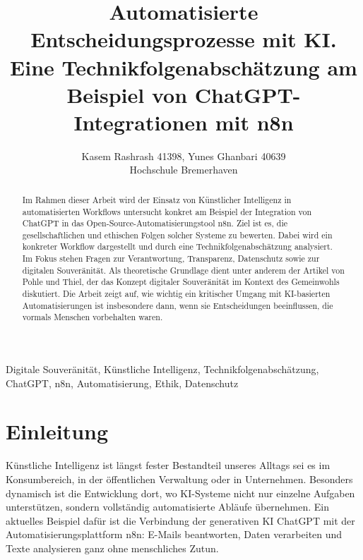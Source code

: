 \documentclass[utf8,biblatex]{bremerhaven_lni}
\begin{document}
\title[Ein Kurztitel]{Automatisierte Entscheidungsprozesse mit KI. Eine Technikfolgenabschätzung am Beispiel von ChatGPT-Integrationen mit n8n}


\author[Kasem Rashrash 41398, Yunes Ghanbari 40639]
{Kasem Rashrash 41398, Yunes Ghanbari 40639\\ 
Hochschule Bremerhaven}
\maketitle

\begin{abstract}
Im Rahmen dieser Arbeit wird der Einsatz von Künstlicher Intelligenz in automatisierten Workflows untersucht
konkret am Beispiel der Integration von ChatGPT in das Open-Source-Automatisierungstool n8n. 
Ziel ist es, die gesellschaftlichen und ethischen Folgen solcher Systeme zu bewerten. 
Dabei wird ein konkreter Workflow dargestellt und durch eine Technikfolgenabschätzung analysiert. 
Im Fokus stehen Fragen zur Verantwortung, Transparenz, Datenschutz sowie zur digitalen Souveränität. 
Als theoretische Grundlage dient unter anderem der Artikel von Pohle und Thiel, der das Konzept digitaler Souveränität 
im Kontext des Gemeinwohls diskutiert. Die Arbeit zeigt auf, wie wichtig ein kritischer Umgang 
mit KI-basierten Automatisierungen ist insbesondere dann, wenn sie Entscheidungen beeinflussen, die vormals Menschen vorbehalten waren.
\end{abstract}

\begin{keywords}
Digitale Souveränität, Künstliche Intelligenz, Technikfolgenabschätzung, ChatGPT, n8n, Automatisierung, Ethik, Datenschutz
\end{keywords}

\section{Einleitung}
Künstliche Intelligenz ist längst fester Bestandteil unseres Alltags sei es im Konsumbereich, in der öffentlichen Verwaltung oder in Unternehmen. Besonders dynamisch ist die Entwicklung dort, wo KI-Systeme nicht nur einzelne Aufgaben unterstützen, sondern vollständig automatisierte Abläufe übernehmen. Ein aktuelles Beispiel dafür ist die Verbindung der generativen KI ChatGPT mit der Automatisierungsplattform n8n: E-Mails beantworten, Daten verarbeiten und Texte analysieren ganz ohne menschliches Zutun.
\end{document}
